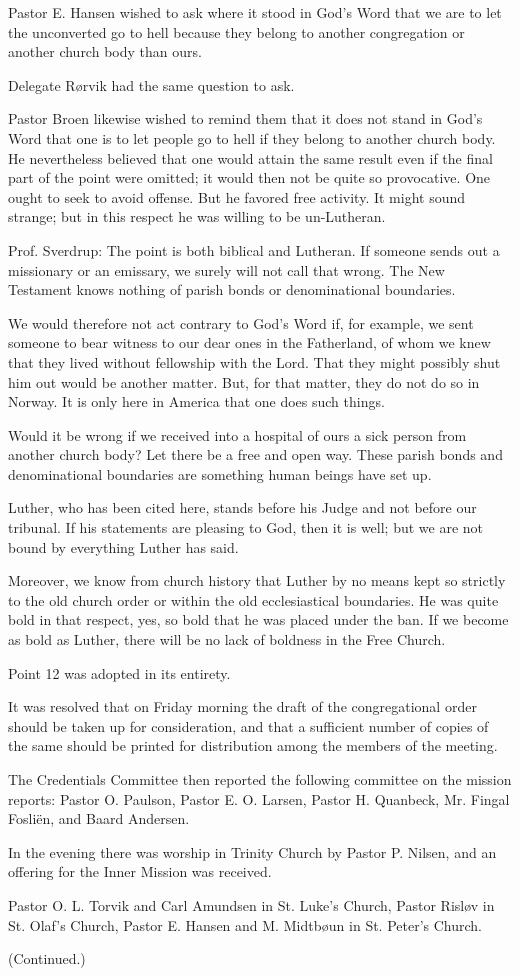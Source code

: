 Pastor E. Hansen wished to ask where it stood in God’s Word that we are to let the unconverted go to hell because they belong to another congregation or another church body than ours.

Delegate Rørvik had the same question to ask.

Pastor Broen likewise wished to remind them that it does not stand in God’s Word that one is to let people go to hell if they belong to another church body. He nevertheless believed that one would attain the same result even if the final part of the point were omitted; it would then not be quite so provocative. One ought to seek to avoid offense. But he favored free activity. It might sound strange; but in this respect he was willing to be un-Lutheran.

Prof. Sverdrup: The point is both biblical and Lutheran. If someone sends out a missionary or an emissary, we surely will not call that wrong. The New Testament knows nothing of parish bonds or denominational boundaries.

We would therefore not act contrary to God’s Word if, for example, we sent someone to bear witness to our dear ones in the Fatherland, of whom we knew that they lived without fellowship with the Lord. That they might possibly shut him out would be another matter. But, for that matter, they do not do so in Norway. It is only here in America that one does such things.

Would it be wrong if we received into a hospital of ours a sick person from another church body? Let there be a free and open way. These parish bonds and denominational boundaries are something human beings have set up.

Luther, who has been cited here, stands before his Judge and not before our tribunal. If his statements are pleasing to God, then it is well; but we are not bound by everything Luther has said.

Moreover, we know from church history that Luther by no means kept so strictly to the old church order or within the old ecclesiastical boundaries. He was quite bold in that respect, yes, so bold that he was placed under the ban. If we become as bold as Luther, there will be no lack of boldness in the Free Church.

Point 12 was adopted in its entirety.

It was resolved that on Friday morning the draft of the congregational order should be taken up for consideration, and that a sufficient number of copies of the same should be printed for distribution among the members of the meeting.

The Credentials Committee then reported the following committee on the mission reports: Pastor O. Paulson, Pastor E. O. Larsen, Pastor H. Quanbeck, Mr. Fingal Fosliën, and Baard Andersen.

In the evening there was worship in Trinity Church by Pastor P. Nilsen, and an offering for the Inner Mission was received.

Pastor O. L. Torvik and Carl Amundsen in St. Luke’s Church, Pastor Risløv in St. Olaf’s Church, Pastor E. Hansen and M. Midtbøun in St. Peter’s Church.

(Continued.)
